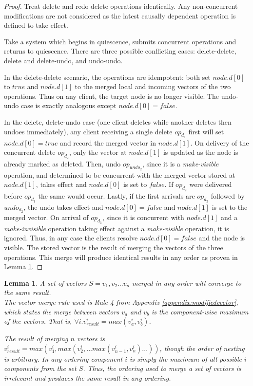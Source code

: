 \documentclass[12pt,a4paper,twoside,openright]{report}
\newtheorem{lemma}{Lemma}
\begin{document}
	\begin{proof}
	
	   	Treat delete and redo delete operations identically. Any non-concurrent modifications are not considered as the latest causally dependent operation is defined to take effect.
		
		Take a system which begins in quiescence, submits concurrent operations and returns to quiescence. There are three possible conflicting cases: delete-delete, delete and delete-undo, and undo-undo.
		
		In the delete-delete scenario, the operations are idempotent: both set $node.d[0]$ to $true$ and $node.d[1]$ to the merged local and incoming vectors of the two operations. Thus on any client, the target node is no longer visible. The undo-undo case is exactly analogous except $node.d[0] = false$. 
		
		In the delete, delete-undo case (one client deletes while another deletes then undoes immediately), any client receiving a single delete $op_{d_1}$ first will set $node.d[0] = true$ and record the merged vector in $node.d[1]$. On delivery of the concurrent delete $op_{d_2}$, only the vector at $node.d[1]$ is updated as the node is already marked as deleted. Then, undo $op_{undo_2}$, since it is a \textit{make-visible} operation, and determined to be concurrent with the merged vector stored at $node.d[1]$, takes effect and $node.d[0]$ is set to $false$. If $op_{d_2}$ were delivered before $op_{d_1}$ the same would occur. Lastly, if the first arrivals are $op_{d_2}$ followed by $undo_{d_2}$, the undo takes effect and $node.d[0] = false$ and $node.d[1]$ is set to the merged vector. On arrival of $op_{d_1}$, since it is concurrent with $node.d[1]$ and a \textit{make-invisible} operation taking effect against a \textit{make-visible} operation, it is ignored. Thus, in any case the clients resolve $node.d[0] = false$ and the node is visible. The stored vector is the result of merging the vectors of the three operations. This merge will produce identical results in any order as proven in Lemma \ref{VectorMergeLemma}.
		
	\end{proof}
	
	\begin{lemma}\label{VectorMergeLemma}
		A set of vectors $S = {v_1, v_2... v_n}$ merged in any order will converge to the same result.\\
		The vector merge rule used is Rule 4 from Appendix \ref{appendix:modifiedvector}, which states the merge between vectors $v_a$ and $v_b$ is the component-wise maximum of the vectors. That is, $\forall i. v_{result}^i = max(v_a^i, v_b^i)$.
		
		The result of merging $n$ vectors is $v_{result}^i = max(v_1^i, max(v_2^i,...max(v_{n-1}^i, v_n^i)...))$, though the order of nesting is arbitrary. In any ordering component $i$ is simply the maximum of all possible $i$ components from the set $S$. Thus, the ordering used to merge a set of vectors is irrelevant and produces the same result in any ordering.
		
	\end{lemma}
\end{document}
